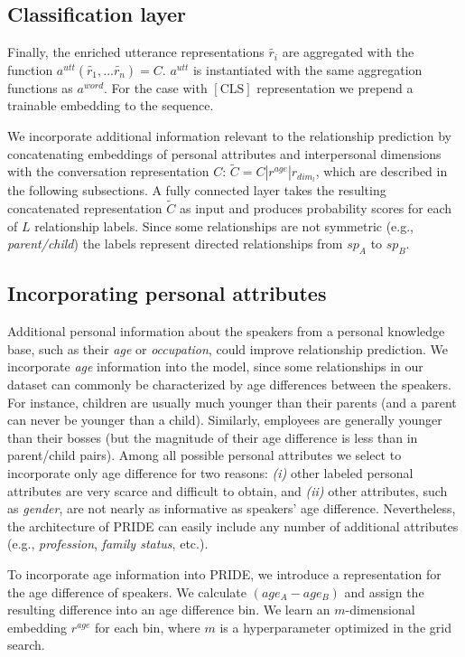 \subsection{Classification layer}

\sloppy Finally, the enriched utterance representations $\tilde{r_i}$ are aggregated with the function ${a^{utt}(\tilde{r_1},...\tilde{r_n})=C}$. $a^{utt}$ is instantiated with the same aggregation functions as $a^{word}$. For the case with $[\textrm{CLS}]$ representation we prepend a trainable embedding to the sequence.

We incorporate additional information relevant to the relationship prediction by concatenating embeddings of personal attributes and interpersonal dimensions with the conversation representation $C$: $\tilde{C} = C|r^{age}|r_{dim_l}$, which are described in the following subsections.
A fully connected layer takes the resulting concatenated representation $\tilde{C}$ as input and produces probability scores for each of $L$ relationship labels. Since some relationships are not symmetric (e.g., \emph{parent/child}) the labels represent directed relationships from $sp_A$ to $sp_B$.


\subsection{Incorporating personal attributes}

Additional personal information about the speakers from a personal knowledge base, such as their \textit{age} or \textit{occupation}, could improve relationship prediction.
We incorporate \textit{age} information into the model, since some relationships in our dataset can commonly be characterized by age differences between the speakers. For instance, children are usually much younger than their parents (and a parent can never be younger than a child). Similarly, employees are generally younger than their bosses (but the magnitude of their age difference is less than in parent/child pairs). Among all possible personal attributes we select to incorporate only age difference for two reasons: \textit{(i)} other labeled personal attributes are very scarce and difficult to obtain, and \textit{(ii)} other attributes, such as \textit{gender}, are not nearly as informative as speakers' age difference. Nevertheless, the architecture of PRIDE can easily include any number of additional attributes (e.g., \textit{profession}, \textit{family status}, etc.).

To incorporate age information into PRIDE, we introduce a representation for the age difference of speakers. We calculate $(age_A - age_B)$ and assign the resulting difference into an age difference bin.
We learn an $m$-dimensional embedding $r^{age}$  for each bin, where $m$ is a hyperparameter optimized in the grid search.

